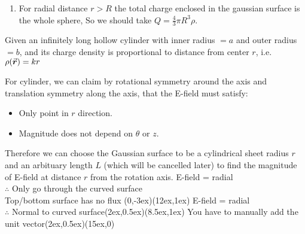 \documentclass[class=article, crop=false, 12pt]{standalone}
\begin{document}
\begin{example}
\begin{enumerate}

        \item For radial distance $r > R$
        the total charge enclosed in the gaussian surface is the whole sphere,
        So we should take $Q=\frac{4}{3}\pi R^3\rho$.

    \end{enumerate}
    
    
\end{example}



\begin{example}
    Given an infinitely long hollow cylinder with inner radius $=a$ and outer radius $=b$,
    and its charge density is proportional to distance from center $r$, i.e. $\rho(\va*{r}) =kr$
    
    For cylinder, we can claim by rotational symmetry around the axis and translation symmetry along the axis,
    that the E-field must satisfy:
    \begin{itemize}
        \item Only point in $r$ direction.
        \item Magnitude does not depend on $\theta$ or $z$.
    \end{itemize}


    Therefore we can choose the Gaussian surface to be a cylindrical sheet radius $r$ 
    and an arbituary length $L$ (which will be cancelled later)
    to find the magnitude of E-field at distance $r$ from the rotation axis.
    {\scriptsize E-field = radial \\[-1ex]\scriptsize $\therefore$ Only go through the curved surface \\[-1ex]\scriptsize Top/bottom surface has no flux}
    {(0,-3ex)}{(12ex,1ex)}
    {\scriptsize E-field = radial \\[-1ex]\scriptsize $\therefore$ Normal to curved surface}{(2ex,0.5ex)}{(8.5ex,1ex)}
    {\scriptsize You have to manually add the unit vector}{(2ex,0.5ex)}{(15ex,0)}


\end{example}
\end{document}
